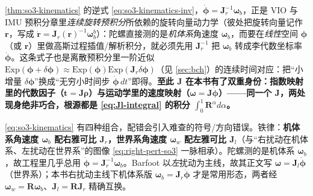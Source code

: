 \begin{insight}[这就是连续旋转预积分所引用的前置定理]
\cref{thm:so3-kinematics} 的逆式 \cref{eq:so3-kinematics-inv}，$\dot{\boldsymbol{\phi}}=\mathbf{J}_r^{-1}\boldsymbol{\omega}_b$，正是 VIO 与 IMU 预积分章里\emph{连续旋转预积分}所依赖的旋转向量动力学（彼处把旋转向量记作 $\mathbf{r}$，写成 $\dot{\mathbf{r}}=\mathbf{J}_r(\mathbf{r})^{-1}\boldsymbol{\omega}_b^b$）：陀螺直接测的是\emph{机体系}角速度 $\boldsymbol{\omega}_b$，而要在\emph{线性}空间 $\boldsymbol{\phi}$（或 $\mathbf{r}$）里做高斯过程插值/解析积分，就必须先用 $\mathbf{J}_r^{-1}$ 把 $\boldsymbol{\omega}_b$ 转成李代数坐标率 $\dot{\boldsymbol{\phi}}$。这条式子也是离散预积分里一阶近似 $\mathrm{Exp}(\boldsymbol{\phi}+\delta\boldsymbol{\phi})\approx\mathrm{Exp}(\boldsymbol{\phi})\mathrm{Exp}(\mathbf{J}_r\delta\boldsymbol{\phi})$（见 \cref{sec:bch}）的连续时间对应：把“小增量 $\delta\boldsymbol{\phi}$”换成“无穷小时间步 $\dot{\boldsymbol{\phi}}\,dt$”即得。\textbf{至此 $\mathbf{J}$ 在本书有了双重身份：指数映射里的代数因子（$\mathbf{t}=\mathbf{J}\boldsymbol{\rho}$）与运动学里的速度映射（$\boldsymbol{\omega}=\mathbf{J}\dot{\boldsymbol{\phi}}$）——同一个 $\mathbf{J}$，两处现身绝非巧合，根源都是 \cref{eq:Jl-integral} 的积分 $\int_0^1\mathbf{R}^\alpha d\alpha$。}
\end{insight}

\begin{pitfall}
\cref{eq:so3-kinematics} 有四种组合，配错会引入难查的符号/方向错误。铁律：\textbf{机体系角速度 $\boldsymbol{\omega}_b$ 配右雅可比 $\mathbf{J}_r$，世界系角速度 $\boldsymbol{\omega}_w$ 配左雅可比 $\mathbf{J}_l$}（与“右扰动在机体系、左扰动在世界系”的图像 \cref{eq:right-pert-so3} 一脉相承）。陀螺测的是机体系 $\boldsymbol{\omega}_b$，故工程里几乎总用 $\dot{\boldsymbol{\phi}}=\mathbf{J}_r^{-1}\boldsymbol{\omega}_b$。Barfoot 以\emph{左}扰动为主线，故其正文写 $\boldsymbol{\omega}=\mathbf{J}_l\dot{\boldsymbol{\phi}}$（世界系）\cite{barfoot2024state}；本书右扰动主线下机体系版 $\boldsymbol{\omega}_b=\mathbf{J}_r\dot{\boldsymbol{\phi}}$ 才是常用形态，两者经 $\boldsymbol{\omega}_w=\mathbf{R}\boldsymbol{\omega}_b$、$\mathbf{J}_l=\mathbf{R}\mathbf{J}_r$ 精确互换。
\end{pitfall}

